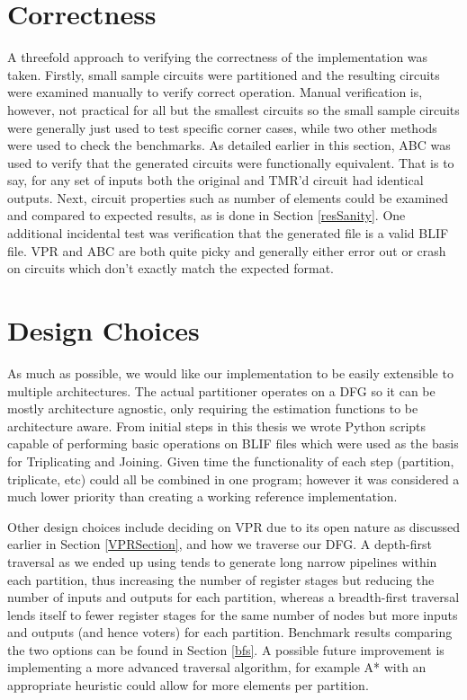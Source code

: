 \documentclass[12pt,final,oneside]{dwThesis} %
\begin{document}
   \section{Correctness}\label{secTesting}
   A threefold approach to verifying the correctness of
   the implementation was taken.  Firstly, small sample circuits were
   partitioned and the resulting circuits were examined manually to verify
   correct operation. Manual verification is, however, not practical for all
   but the smallest circuits so the small sample circuits were generally just
   used to test specific corner cases, while two other methods were used to
   check the benchmarks. As detailed earlier in this section, \gls{ABC} was
   used to verify that the generated circuits were functionally equivalent.
   That is to say, for any set of inputs both the original and TMR'd circuit
   had identical outputs.  Next, circuit properties such as number of elements
   could be examined and compared to expected results, as is done in Section
   \ref{resSanity}.  One additional incidental test was verification that the
   generated file is a valid \gls{BLIF} file. \gls{VPR} and \gls{ABC} are both
   quite picky and generally either error out or crash on circuits which don't
   exactly match the expected format.



   \section{Design Choices}
   As much as possible, we would like our
   implementation to be easily extensible to multiple architectures. The actual
   partitioner operates on a \gls{DFG} so it can be mostly architecture
   agnostic, only requiring the estimation functions to be architecture aware.
   From initial steps in this thesis we wrote Python scripts capable of
   performing basic operations on \gls{BLIF} files which were used as the basis
   for Triplicating and Joining. Given time the functionality of each step
   (partition, triplicate, etc) could all be combined in one program; however
   it was considered a much lower priority than creating a working reference
   implementation.

   Other design choices include deciding on \gls{VPR} due to its open nature as
   discussed earlier in Section \ref{VPRSection}, and how we traverse our
   \gls{DFG}. A depth-first traversal as we ended up using tends to generate
   long narrow pipelines within each partition, thus increasing the number of
   register stages but reducing the number of inputs and outputs for each
   partition, whereas a breadth-first traversal lends itself to fewer register
   stages for the same number of nodes but more inputs and outputs (and hence
   voters) for each partition. Benchmark results
   comparing the two options can be found in Section \ref{bfs}.
    A possible future improvement is implementing a
   more advanced traversal algorithm, for example A* with an appropriate
   heuristic could allow for more elements per partition.
\end{document}
